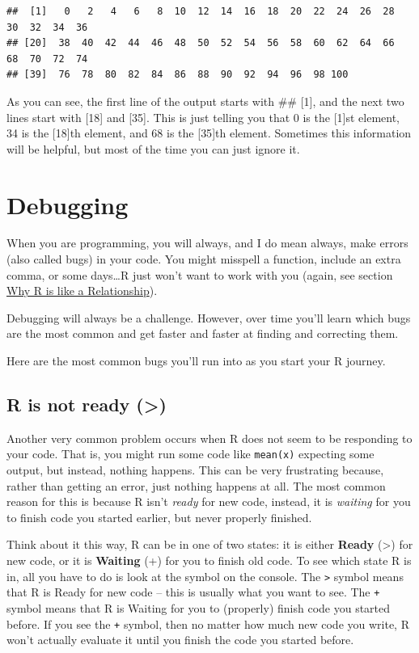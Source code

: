 \documentclass[
]{book}
\begin{document}
\begin{verbatim}
##  [1]   0   2   4   6   8  10  12  14  16  18  20  22  24  26  28  30  32  34  36
## [20]  38  40  42  44  46  48  50  52  54  56  58  60  62  64  66  68  70  72  74
## [39]  76  78  80  82  84  86  88  90  92  94  96  98 100
\end{verbatim}

As you can see, the first line of the output starts with \#\# {[}1{]}, and the next two lines start with {[}18{]} and {[}35{]}. This is just telling you that 0 is the {[}1{]}st element, 34 is the {[}18{]}th element, and 68 is the {[}35{]}th element. Sometimes this information will be helpful, but most of the time you can just ignore it.

\hypertarget{INSTALL-DEBUG}{%
\section{Debugging}\label{INSTALL-DEBUG}}

When you are programming, you will always, and I do mean always, make errors (also called bugs) in your code. You might misspell a function, include an extra comma, or some days\ldots R just won't want to work with you (again, see section \protect\hyperlink{rrelationship}{Why R is like a Relationship}).

Debugging will always be a challenge. However, over time you'll learn which bugs are the most common and get faster and faster at finding and correcting them.

Here are the most common bugs you'll run into as you start your R journey.

\hypertarget{r-is-not-ready}{%
\subsection{R is not ready (\textgreater)}\label{r-is-not-ready}}

Another very common problem occurs when R does not seem to be responding to your code. That is, you might run some code like \texttt{mean(x)} expecting some output, but instead, nothing happens. This can be very frustrating because, rather than getting an error, just nothing happens at all. The most common reason for this is because R isn't \emph{ready} for new code, instead, it is \emph{waiting} for you to finish code you started earlier, but never properly finished.

Think about it this way, R can be in one of two states: it is either \textbf{Ready} (\textgreater) for new code, or it is \textbf{Waiting} (+) for you to finish old code. To see which state R is in, all you have to do is look at the symbol on the console. The \texttt{\textgreater{}} symbol means that R is Ready for new code -- this is usually what you want to see. The \texttt{+} symbol means that R is Waiting for you to (properly) finish code you started before. If you see the \texttt{+} symbol, then no matter how much new code you write, R won't actually evaluate it until you finish the code you started before.
\end{document}
